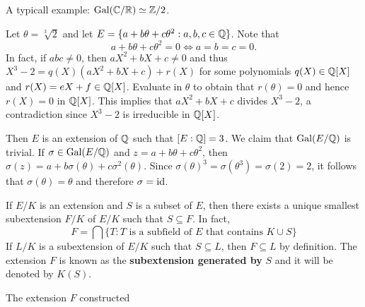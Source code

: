A typicall example: $\operatorname{Gal}(\mathbb{C}/\mathbb{R})\simeq\mathbb{Z}/2$. 

\begin{example}
	Let $\theta=\sqrt[3]{2}$ and let $E=\{a+b\theta+c\theta^2:a,b,c\in\mathbb{Q}\}$. Note that 
\[
	a+b\theta+c\theta^2=0 \Longleftrightarrow a=b=c=0. 
\]
In fact, if $abc\ne 0$, then $aX^2+bX+c\ne 0$ and 
thus $X^3-2=q(X)(aX^2+bX+c)+r(X)$ for some polynomials
$q(X)\in\mathbb{Q}[X]$ and $r(X)=eX+f\in\mathbb{Q}[X]$. Evaluate in $\theta$ 
to obtain that $r(\theta)=0$ and hence $r(X)=0$ in $\mathbb{Q}[X]$. This implies  
that $aX^2+bX+c$ divides $X^3-2$, a contradiction since
$X^3-2$ is irreducible in $\mathbb{Q}[X]$. 

Then $E$ is an extension of $\mathbb{Q}$ such that $[E:\mathbb{Q}]=3$. We claim
that $\operatorname{Gal}(E/\mathbb{Q})$ is trivial. If 
$\sigma\in\operatorname{Gal}(E/\mathbb{Q})$ and $z=a+b\theta+c\theta^2$, then
$\sigma(z)=a+b\sigma(\theta)+c\sigma^2(\theta)$. Since
$\sigma(\theta)^3=\sigma(\theta^3)=\sigma(2)=2$, it follows
that $\sigma(\theta)=\theta$ and therefore
$\sigma=\operatorname{id}$. 
\end{example}

If $E/K$ is an extension and $S$ is a subset of $E$, then
there exists a unique smallest 
subextension $F/K$ of $E/K$ such that
$S\subseteq F$. In fact, 
\[
	F=\bigcap\{T:\text{$T$ is a subfield of $E$ that contains $K\cup S$}\} 
\]
If $L/K$ is a subextension of $E/K$ such that 
$S\subseteq L$, then $F\subseteq L$ by definition. The 
extension $F$ is known as the \textbf{subextension generated by} 
$S$ and
it will be denoted by $K(S)$. 

\begin{definition}
	The extension $F$ constructed 
\end{definition}


\begin{proposition}

\end{proposition}
